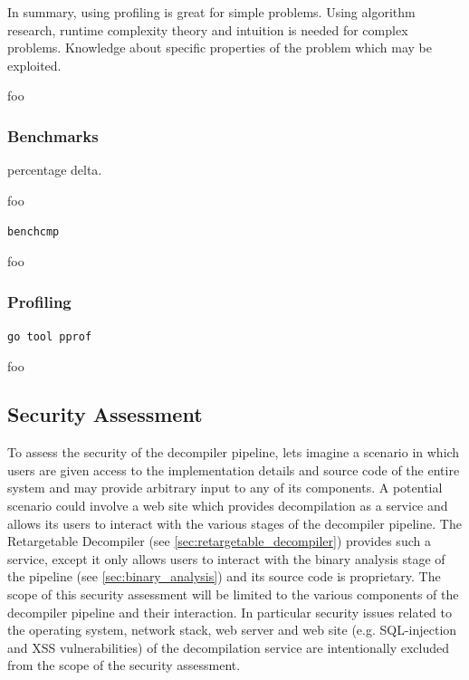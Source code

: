 In summary, using profiling is great for simple problems. Using algorithm research, runtime complexity theory and intuition is needed for complex problems. Knowledge about specific properties of the problem which may be exploited.

foo

\subsubsection{Benchmarks}

percentage delta.

foo

\texttt{benchcmp}

foo

\subsubsection{Profiling}



\texttt{go tool pprof}

foo


\subsection{Security Assessment}


To assess the security of the decompiler pipeline, lets imagine a scenario in which users are given access to the implementation details and source code of the entire system and may provide arbitrary input to any of its components. A potential scenario could involve a web site which provides decompilation as a service and allows its users to interact with the various stages of the decompiler pipeline. The Retargetable Decompiler (see \cref{sec:retargetable_decompiler}) provides such a service, except it only allows users to interact with the binary analysis stage of the pipeline (see \cref{sec:binary_analysis}) and its source code is proprietary. The scope of this security assessment will be limited to the various components of the decompiler pipeline and their interaction. In particular security issues related to the operating system, network stack, web server and web site (e.g. SQL-injection and XSS vulnerabilities) of the decompilation service are intentionally excluded from the scope of the security assessment.

